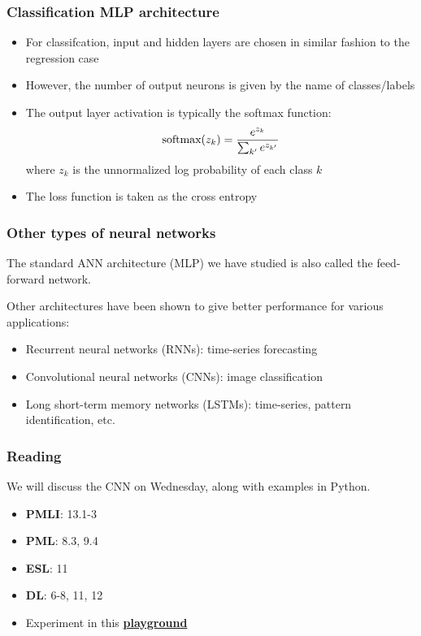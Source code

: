 \documentclass[smaller]{beamer}
\begin{document}
\begin{frame}
  \frametitle{Classification MLP architecture}
  \pause
  \begin{itemize}
  \item For classifcation, input and hidden layers are chosen in similar fashion to the regression case

    \pause

  \item However, the number of output neurons is given by the name of classes/labels

  \item The output layer activation is typically the softmax function:
    \begin{equation}
      \text{softmax}(z_{k}) = \frac{e^{z_{k}}}{\sum_{k'}e^{z_{k'}}}
    \end{equation}
    where $z_{k}$ is the unnormalized log probability of each class $k$
    
    \pause
    
  \item The loss function is taken as the cross entropy 
  \end{itemize}
\end{frame}

\begin{frame}
  \frametitle{Other types of neural networks}
  \pause

  The standard ANN architecture (MLP) we have studied is also called the feed-forward network.

  \medskip
  
  Other architectures have been shown to give better performance for various applications: \pause

  \medskip
  \begin{itemize}[<+->]
  \item Recurrent neural networks (RNNs): time-series forecasting

  \item Convolutional neural networks (CNNs): image classification

  \item Long short-term memory networks (LSTMs): time-series, pattern identification, etc.
  \end{itemize}

\end{frame}

\begin{frame}
  \frametitle{Reading}
 We will discuss the CNN on Wednesday, along with examples in Python.
 \begin{itemize}[<+->]
 \item \textbf{PMLI}: 13.1-3
 \item \textbf{PML}: 8.3, 9.4
 \item \textbf{ESL}: 11
 \item \textbf{DL}: 6-8, 11, 12 
 \item Experiment in this \href{http://playground.tensorflow.org}{\bl \bf playground}
  \end{itemize}
\end{frame}
 
\end{document}
